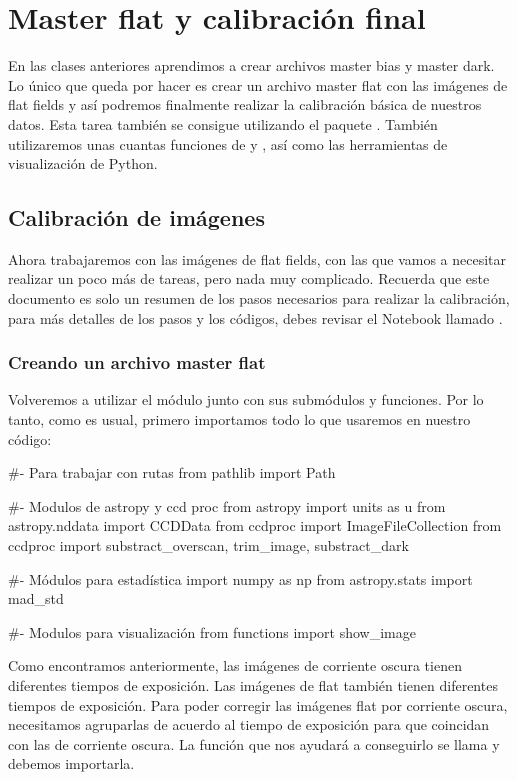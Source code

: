 \chapter{Master flat y calibración final}
\setcounter{ipythcntr}{0}

En las clases anteriores aprendimos a crear archivos master bias y master dark. Lo único que queda por hacer es crear un archivo master flat con las imágenes de flat fields y así podremos finalmente realizar la calibración básica de nuestros datos. Esta tarea también se consigue utilizando el paquete . También utilizaremos unas cuantas funciones de  y , así como las herramientas de visualización de Python.  

\section{Calibración de imágenes}
Ahora trabajaremos con las imágenes de flat fields, con las que vamos a necesitar realizar un poco más de tareas, pero nada muy complicado. Recuerda que este documento es solo un resumen de los pasos necesarios para realizar la calibración, para más detalles de los pasos y los códigos, debes revisar el Notebook llamado . 

\subsection{Creando un archivo master flat}
Volveremos a utilizar el módulo  junto con sus submódulos y funciones. Por lo tanto, como es usual, primero importamos todo lo que usaremos en nuestro código:

\begin{pyin}[]
#- Para trabajar con rutas
from pathlib import Path

#- Modulos de astropy y ccd proc
from astropy import units as u
from astropy.nddata import CCDData
from ccdproc import ImageFileCollection
from  ccdproc import substract_overscan, trim_image, substract_dark

#- Módulos para estadística
import numpy as np
from astropy.stats import mad_std

#- Modulos para visualización
from functions import show_image 
\end{pyin}

Como encontramos anteriormente, las imágenes de corriente oscura tienen diferentes tiempos de exposición. Las imágenes de flat también tienen diferentes tiempos de exposición. Para poder corregir las imágenes flat por corriente oscura, necesitamos agruparlas de acuerdo al tiempo de exposición para que coincidan con las de corriente oscura. La función que nos ayudará a conseguirlo se llama  y debemos importarla.

